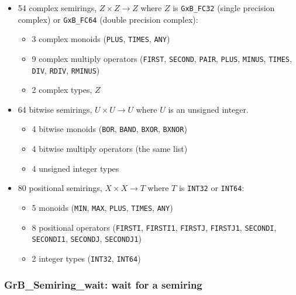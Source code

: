\documentclass[12pt]{article}
\begin{document}
\begin{itemize}
\item 54 complex semirings, $Z \times Z \rightarrow Z$ where $Z$ is
    \verb'GxB_FC32' (single precision complex) or
    \verb'GxB_FC64' (double precision complex):

    \vspace{-0.05in}
    \begin{itemize}
    \item 3 complex monoids (\verb'PLUS', \verb'TIMES', \verb'ANY')
    \item 9 complex multiply operators
        (\verb'FIRST', \verb'SECOND', \verb'PAIR', \verb'PLUS', \verb'MINUS',
            \verb'TIMES', \verb'DIV', \verb'RDIV', \verb'RMINUS')
    \item 2 complex types, $Z$
    \end{itemize}

\item 64 bitwise semirings, $U \times U \rightarrow U$ where $U$ is
    an unsigned integer.

    \vspace{-0.05in}
    \begin{itemize}
    \item 4 bitwise monoids (\verb'BOR', \verb'BAND', \verb'BXOR', \verb'BXNOR')
    \item 4 bitwise multiply operators (the same list)
    \item 4 unsigned integer types
    \end{itemize}

\item 80 positional semirings, $X \times X \rightarrow T$ where $T$ is
    \verb'INT32' or \verb'INT64':

    \vspace{-0.05in}
    \begin{itemize}
    \item 5 monoids (\verb'MIN', \verb'MAX', \verb'PLUS', \verb'TIMES', \verb'ANY')
    \item 8 positional operators
        (\verb'FIRSTI', \verb'FIRSTI1', \verb'FIRSTJ', \verb'FIRSTJ1',
        \verb'SECONDI', \verb'SECONDI1', \verb'SECONDJ', \verb'SECONDJ1')
    \item 2 integer types (\verb'INT32', \verb'INT64')
    \end{itemize}

\end{itemize}

\subsubsection{{\sf GrB\_Semiring\_wait:} wait for a semiring}
\label{semiring_wait}
\end{document}
